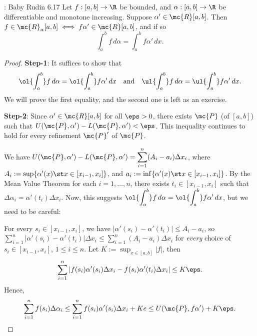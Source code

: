 \begin{ntheorem}{: Baby Rudin 6.17}
	Let \(f:[a,b]\to\R\) be bounded, and \(\alpha:[a,b]\to\R\) be differentiable and monotone increasing. Suppose \(\alpha'\in\mc{R}[a,b]\). Then \(f\in\mc{R}_{\alpha}[a,b]\iff f\alpha'\in\mc{R}[a,b]\), and if so 
	\begin{equation*}
		\int_a^b f \, d\alpha=\int_a^b f\alpha' \, dx.
	\end{equation*}
\end{ntheorem}

\begin{proof}
	\textbf{Step-1}: It suffices to show that 
	\begin{equation*}
		\ol{\int_a^b}f \, d\alpha=\ol{\int_a^b} f\alpha' \, dx\quad\text{and}\quad \ul{\int_a^b}f \, d\alpha=\ul{\int_a^b} f\alpha' \, dx.
	\end{equation*}
	We will prove the first equality, and the second one is left as an exercise.
	
	\medskip
	
	\textbf{Step-2}: Since \(\alpha'\in\mc{R}[a,b]\) for all \(\eps>0\), there exists \(\mc{P}\) (of \([a,b]\)) such that \(U(\mc{P},\alpha')-L(\mc{P},\alpha')<\eps\). This inequality continues to hold for every refinement \(\mc{P}'\) of \(\mc{P}\).
	
	\medskip
	
	We have \(U(\mc{P},\alpha')-L(\mc{P},\alpha')=\displaystyle\sum_{i=1}^{n}(A_i-a_i)\Delta x_i\), where \(A_i:=\sup\{\alpha'(x)\st x\in[x_{i-1},x_i]\}\), and \(a_i:=\inf\{\alpha'(x)\st x\in[x_{i-1},x_i]\}\). By the Mean Value Theorem for each \(i=1,\dots, n\), there exists \(t_i\in[x_{i-1},x_i]\) such that \(\Delta\alpha_i=\alpha'(t_i)\Delta x_i\). Now, this suggests \(\displaystyle \ol{\int_a^b}f \, d\alpha=\ol{\int_a^b} f\alpha' \, dx\), but we need to be careful:
	
	\medskip
	
	For every \(s_i\in [x_{i-1},x_i]\), we have \(|\alpha'(s_i)-\alpha'(t_i)|\leq A_i-a_i\), so \(\displaystyle\sum_{i=1}^n|\alpha'(s_i)-\alpha'(t_i)|\Delta x_i\leq \displaystyle\sum_{i=1}^n(A_i-a_i)\Delta x_i\) for \emph{every} choice of \(s_i\in [x_{i-1},x_i]\), \(1\leq i\leq n\). Let \(K:=\sup_{x\in [a,b]}{|f|}\), then
	\begin{equation}
		\sum_{i=1}^n |f(s_i)\alpha'(s_i)\Delta x_i-f(s_i)\alpha'(t_i)\Delta x_i|\leq K\eps.\label{sup bound}
	\end{equation}
	Hence, 
	\begin{equation*}
		\sum_{i=1}^n f(s_i)\Delta\alpha_i\leq \sum_{i=1}^n f(s_i)\alpha'(s_i)\Delta x_i+Ke\leq U(\mc{P},f\alpha')+K\eps.
	\end{equation*}
	

\end{proof}
